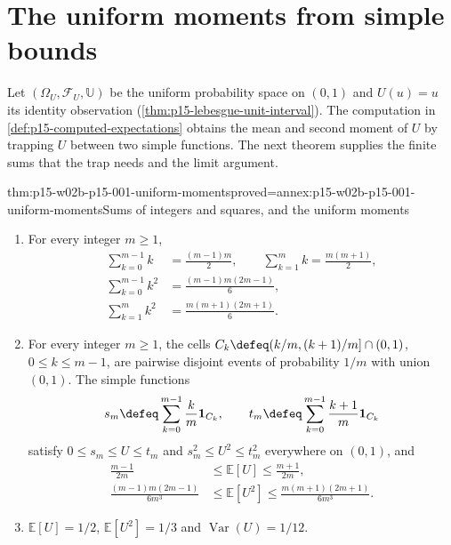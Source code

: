 \section{The uniform moments from simple bounds}
\label{sec:p15-w02b-p15-001-uniform}

Let \((\Omega_U,\mathcal F_U,\mathbb U)\) be the uniform probability
space on \((0,1)\) and \(U(u)=u\) its identity observation
(\cref{thm:p15-lebesgue-unit-interval}). The computation in
\cref{def:p15-computed-expectations} obtains the mean and second moment
of \(U\) by trapping \(U\) between two simple functions. The next
theorem supplies the finite sums that the trap needs and the limit
argument.

\begin{hbtheorem}{thm:p15-w02b-p15-001-uniform-moments}{proved=annex:p15-w02b-p15-001-uniform-moments}{Sums of integers and squares, and the uniform moments}
\par\nobreak
\begin{enumerate}
\item For every integer \(m\geq1\),
      \[
       \begin{aligned}
       \sum_{k=0}^{m-1}k&=\frac{(m-1)m}2,\qquad
       \sum_{k=1}^{m}k=\frac{m(m+1)}2,\\
       \sum_{k=0}^{m-1}k^2&=\frac{(m-1)m(2m-1)}6,\\
       \sum_{k=1}^{m}k^2&=\frac{m(m+1)(2m+1)}6.
       \end{aligned}
      \]
\item For every integer \(m\geq1\), the cells
      \(C_k\defeq(k/m,(k+1)/m]\cap(0,1)\), \(0\leq k\leq m-1\), are
      pairwise disjoint events of probability \(1/m\) with union
      \((0,1)\). The simple functions
      \[
       s_m\defeq\sum_{k=0}^{m-1}\frac km\mathbf1_{C_k},\qquad
       t_m\defeq\sum_{k=0}^{m-1}\frac{k+1}m\mathbf1_{C_k}
      \]
      satisfy \(0\leq s_m\leq U\leq t_m\) and
      \(s_m^2\leq U^2\leq t_m^2\) everywhere on \((0,1)\), and
      \[
       \begin{aligned}
       \frac{m-1}{2m}&\leq\mathbb E[U]\leq\frac{m+1}{2m},\\
       \frac{(m-1)m(2m-1)}{6m^3}&\leq\mathbb E[U^2]
         \leq\frac{m(m+1)(2m+1)}{6m^3}.
       \end{aligned}
      \]
\item \(\mathbb E[U]=1/2\), \(\mathbb E[U^2]=1/3\) and
      \(\operatorname{Var}(U)=1/12\).
\end{enumerate}
\end{hbtheorem}

